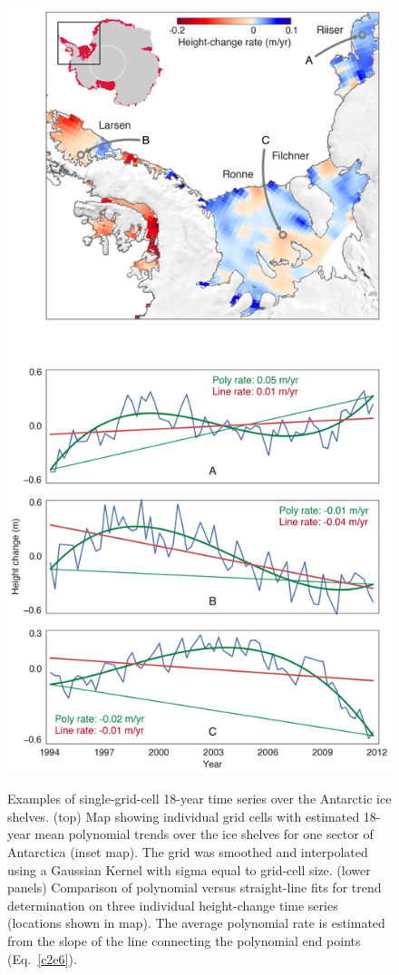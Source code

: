 \begin{figure}[!ht]
  \centering
  \includegraphics[width=.71\textwidth]{img/map_single_series_v9b.png}
\end{figure}
\begin{figure}
  \captionsetup{labelformat=adja-page}
  \ContinuedFloat
  \caption[Examples of single-grid-cell 18-year time series]{
  Examples of single-grid-cell 18-year time series over the Antarctic ice shelves. (top) Map showing individual grid cells with estimated 18-year mean polynomial trends over the ice shelves for one sector of Antarctica (inset map). The grid was smoothed and interpolated using a Gaussian Kernel with sigma equal to grid-cell size.  (lower panels) Comparison of polynomial versus straight-line fits for trend determination on three individual height-change time series (locations shown in map). The average polynomial rate is estimated from the slope of the line connecting the polynomial end points (Eq.~\ref{c2e6}).
  } 
  \label{c2f6}
\end{figure}


